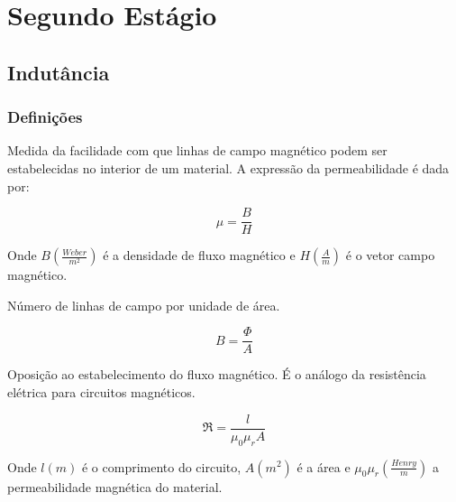 \documentclass[12pt,fleqn]{book} %
\begin{document}
\part{Segundo Estágio}{

	
\chapter{Indutância}

\section{Definições}

\begin{definition} Medida da facilidade com que linhas de campo magnético podem ser estabelecidas no interior de um material. A expressão da permeabilidade é dada por:

\begin{equation}
\mu = \frac{B}{H}
\end{equation}

Onde $B (\frac{Weber}{m^2})$ é a densidade de fluxo magnético e $H (\frac{A}{m})$ é o vetor campo magnético.

\end{definition}

\begin{definition}Número de linhas de campo por unidade de área.

\begin{equation}
B = \frac{\Phi}{A}
\end{equation}

\end{definition}

\begin{definition}Oposição ao estabelecimento do fluxo magnético. É o análogo da resistência elétrica para circuitos magnéticos.

\begin{equation}
\mathfrak{R} = \frac{l}{\mu_0\mu_rA}
\end{equation}

Onde $l(m)$ é o comprimento do circuito, $A(m^2)$ é a área e $\mu_0\mu_r(\frac{Henry}{m})$ a permeabilidade magnética do material.


\end{definition}}
\end{document}
